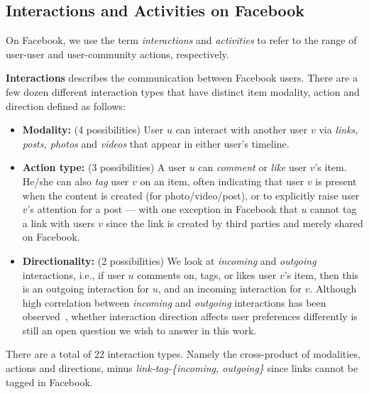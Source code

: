 \subsection{Interactions and Activities on Facebook}

On Facebook, we use the term {\em interactions} and {\em activities}
to refer to the range of user-user and user-community actions,
respectively.

{\bf Interactions} describes the communication between Facebook users. There are a few dozen different interaction types that have distinct item modality, action and direction defined
as follows:
\begin{itemize}
\item \textbf{Modality:} (4 possibilities)
User $u$ can interact with another user $v$ via \textit{links, posts, photos} and \textit{videos} that appear in either user's timeline.

\item \textbf{Action type:} (3 possibilities)
A user $u$ can \textit{comment} or \textit{like} 
user $v$'s item. He/she can also \textit{tag} user $v$ on an 
item, often indicating that user $v$ is present when the content is created (for photo/video/post), 
or to explicitly raise user $v$'s attention for a post --- with one exception in Facebook that $u$ cannot tag a link with users $v$ since the link is created by third parties and merely shared on Facebook.

\item \textbf{Directionality:} (2 possibilities)
We look at \textit{incoming} and \textit{outgoing} interactions, i.e.,
if user $u$ comments on, tags, or likes user $v$'s item,
then this is an outgoing interaction for $u$, and an incoming interaction for $v$.
Although high correlation between \textit{incoming} and \textit{outgoing} interactions 
has been observed~\cite{saez2011high}, whether interaction direction 
affects user preferences differently is still an open question we wish to answer
in this work. 
      								
\end{itemize}

There are a total of 22 interaction types. Namely the cross-product of modalities, actions and directions, minus {\em link-tag-\{incoming, outgoing\}} since links cannot be tagged in Facebook.




